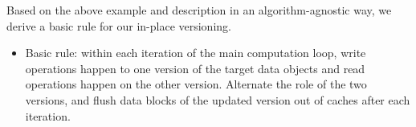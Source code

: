 Based on the above example and description in an algorithm-agnostic
way, we derive a basic rule for our in-place versioning.

\begin{itemize}
\vspace{-10pt}
\item Basic rule: within each iteration of the main computation loop, write operations happen to one version of the target data objects and read operations happen on the other version. Alternate the role of the two versions, and flush data blocks of the updated version out of caches after each iteration.  %
\end{itemize}

\begin{comment}
$update(u)$ will be called in each iteration, and each element of u will be updated. In dual version codes, we will have two version of u and they are denoted as $u_o$ and $u_e$ respectively.  In odd iteration only $u_o$ will be written, while in even iteration only $u_e$ be updated. Hence We will have a persistent clean copy of $u$ whenever program crashed. In function $update$, whenever $u$ appears at the right rand side it will be replaced with $u_{old}$. If $u$ appears at the left hand side, it will be replaced with $u_{new}$. With such simple rule, we can assure that we always read from old version of data and write to the elements of new version of data. New version and old version is switched across iteration. A clean data object will be preserved during each iteration which could be served as restarting data if the program  crashed.
\end{comment}



\lstset{style=style1}

